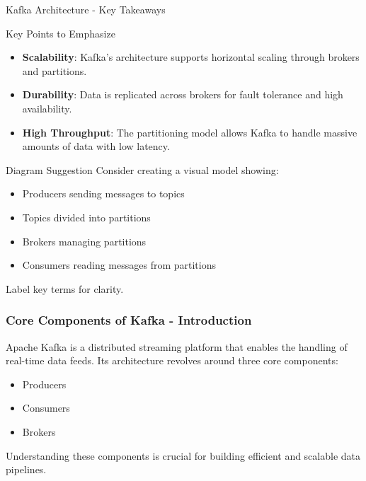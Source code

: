 \documentclass[aspectratio=169]{beamer}
\begin{document}
\begin{frame}[fragile]{Kafka Architecture - Key Takeaways}
    \begin{block}{Key Points to Emphasize}
        \begin{itemize}
            \item \textbf{Scalability}: Kafka’s architecture supports horizontal scaling through brokers and partitions.
            \item \textbf{Durability}: Data is replicated across brokers for fault tolerance and high availability.
            \item \textbf{High Throughput}: The partitioning model allows Kafka to handle massive amounts of data with low latency.
        \end{itemize}
    \end{block}
    
    \begin{block}{Diagram Suggestion}
        Consider creating a visual model showing:
        \begin{itemize}
            \item Producers sending messages to topics
            \item Topics divided into partitions
            \item Brokers managing partitions
            \item Consumers reading messages from partitions
        \end{itemize}
        Label key terms for clarity.
    \end{block}
\end{frame}

\begin{frame}[fragile]
    \frametitle{Core Components of Kafka - Introduction}
    Apache Kafka is a distributed streaming platform that enables the handling of real-time data feeds. Its architecture revolves around three core components: 
    \begin{itemize}
        \item Producers
        \item Consumers
        \item Brokers
    \end{itemize}
    Understanding these components is crucial for building efficient and scalable data pipelines.
\end{frame}
\end{document}
